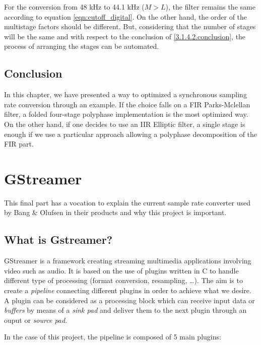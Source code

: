 For the conversion from 48 kHz to 44.1 kHz ($M > L$), the filter remains the same according to equation \ref{eqn:cutoff_digital}. On the other hand, the order of the multistage factors should be different. But, considering that the number of stages will be the same and with respect to the conclusion of \ref{3.1.4.2.conclusion}, the process of arranging the stages can be automated. 

\subsection{Conclusion}

In this chapter, we have presented a way to optimized a synchronous sampling rate conversion through an example. If the choice falls on a FIR Parks-Mclellan filter, a folded four-stage polyphase implementation is the most optimized way. On the other hand, if one decides to use an IIR Elliptic filter, a single stage is enough if we use a particular approach allowing a polyphase decomposition of the FIR part. 








\section{GStreamer}


This final part has a vocation to explain the current sample rate converter used by Bang \& Olufsen in their products and why this project is important. \\

\subsection{What is Gstreamer?}

GStreamer is a framework creating streaming multimedia applications involving video such as audio. It is based on the use of plugins written in C to handle different type of processing (format conversion, resampling, \dots). The aim is to create a \textit{pipeline} connecting different plugins in order to achieve what we desire. A plugin can be considered as a processing block which can receive input data or \textit{buffers} by means of a \textit{sink pad} and deliver them to the next plugin through an ouput or \textit{source pad}.

In the case of this project, the pipeline is composed of 5 main plugins:

